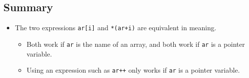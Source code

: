 \subsection{Summary}
\begin{itemize}
    \item The two expressions \texttt{ar[i]} and \texttt{*(ar+i)} are equivalent in meaning.
        \begin{itemize}
            \item Both work if \texttt{ar} is the name of an array, and both work if \texttt{ar} is a pointer variable. 
            \item Using an expression such as \texttt{ar++} only works if \texttt{ar} is a pointer variable. 
        \end{itemize}
\end{itemize}

